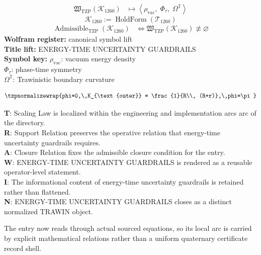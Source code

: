 \noindent
\begin{minipage}[t]{0.48\linewidth}
\begingroup
\small
\[
\begin{aligned}
\mathfrak{W}_{\mathrm{TZP}}\!\left(\mathcal{K}_{1260}\right)
&\longmapsto
\left\langle \rho_{\mathrm{vac}},\; \Phi_{\tau},\; \Omega^{\mathbb{T}} \right\rangle
\end{aligned}
\]
\[
\mathcal{K}_{1260}
:=
\operatorname{HoldForm}\!\left(\mathcal{T}_{1260}\right)
\]
\[
\begin{aligned}
\operatorname{Admissible}_{\mathrm{TZP}}\!\left(\mathcal{K}_{1260}\right)
&\Longleftrightarrow
\mathfrak{W}_{\mathrm{TZP}}\!\left(\mathcal{K}_{1260}\right)\not\equiv\varnothing
\end{aligned}
\]
\textbf{Wolfram register:} canonical symbol lift\\
\textbf{Title lift:} ENERGY-TIME UNCERTAINTY GUARDRAILS\\
\textbf{Symbol key:} \(\rho_{\mathrm{vac}}\): vacuum energy density\\ \(\Phi_{\tau}\): phase-time symmetry\\ \(\Omega^{\mathbb{T}}\): Trawinistic boundary curvature
\par
\endgroup
\end{minipage}\hfill
\begin{minipage}[t]{0.48\linewidth}
\[
\tzpnormalizewrap{phi=0,\,K_{\text{outer}} = \frac{1}{R\\, (R+r)},\,phi=\pi}
\]

\small
\textbf{T}: Scaling Law is localized within the engineering and implementation arcs arc of the directory.\\
\textbf{R}: Support Relation preserves the operative relation that energy-time uncertainty guardrails requires.\\
\textbf{A}: Closure Relation fixes the admissible closure condition for the entry.\\
\textbf{W}: ENERGY-TIME UNCERTAINTY GUARDRAILS is rendered as a reusable operator-level statement.\\
\textbf{I}: The informational content of energy-time uncertainty guardrails is retained rather than flattened.\\
\textbf{N}: ENERGY-TIME UNCERTAINTY GUARDRAILS closes as a distinct normalized TRAWIN object.
\normalsize
\end{minipage}

The entry now reads through actual sourced equations, so its local arc is carried by explicit mathematical relations rather than a uniform quaternary certificate record shell.
\clearpage

